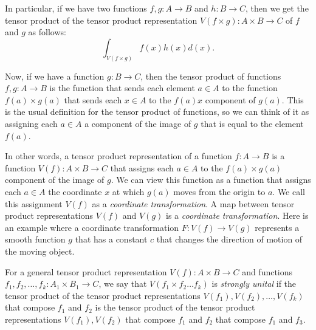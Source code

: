 \documentclass[a4paper,reqno,oneside]{article}
\begin{document}
In particular, if we have two functions $f, g: A \to B$ and $h: B \to C$, then we get the tensor product of the tensor product representation $V(f \times g): A \times B \to C$ of $f$ and $g$ as follows:
\[\int_{V(f \times g)} f(x)h(x) d(x).\]

Now, if we have a function $g: B \to C$, then the tensor product of functions $f, g: A \to B$ is the function that sends each element $a \in A$ to the function $f(a) \times g(a)$ that sends each $x \in A$ to the $f(a) x$ component of $g(a)$. This is the usual definition for the tensor product of functions, so we can think of it as assigning each $a \in A$ a component of the image of $g$ that is equal to the element $f(a)$.

In other words, a tensor product representation of a function $f: A \to B$ is a function $V(f): A \times B \to C$ that assigns each $a \in A$ to the $f(a) \times g(a)$ component of the image of $g$. We can view this function as a function that assigns each $a \in A$ the coordinate $x$ at which $g(a)$ moves from the origin to $a$. We call this assignment $V(f)$ as a \textit{coordinate transformation}. A map between tensor product representations $V(f)$ and $V(g)$ is a \textit{coordinate transformation}. Here is an example where a coordinate transformation $F: V(f) \to V(g)$ represents a smooth function $g$ that has a constant $c$ that changes the direction of motion of the moving object.

For a general tensor product representation $V(f): A \times B \to C$ and functions $f_1, f_2, \dots, f_k: A_1 \times B_1 \to C$, we say that $V(f_1 \times f_2 \dots f_k)$ is \textit{strongly unital} if the tensor product of the tensor product representations $V(f_1), V(f_2), \dots, V(f_k)$ that compose $f_1$ and $f_2$ is the tensor product of the tensor product representations $V(f_1), V(f_2)$ that compose $f_1$ and $f_2$ that compose $f_1$ and $f_3$.
\end{document}
